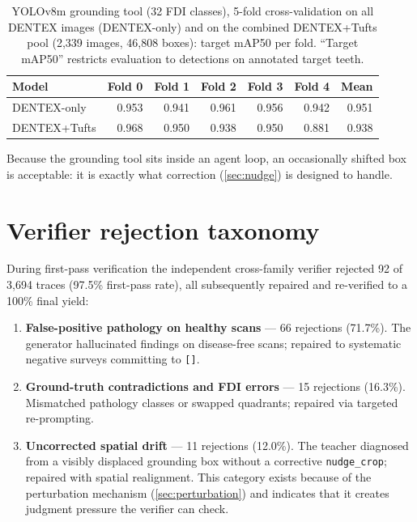 \begin{table}[htbp]
  \centering
  \small
  \caption{YOLOv8m grounding tool (32 FDI classes), 5-fold cross-validation on all DENTEX images
  (DENTEX-only) and on the combined DENTEX+Tufts pool (2{,}339 images, 46{,}808 boxes): target mAP50 per fold.
  ``Target mAP50'' restricts evaluation to detections on annotated target teeth.}
  \label{tab:grounding}
  \begin{tabular}{lrrrrrr}
    \toprule
    Model & Fold 0 & Fold 1 & Fold 2 & Fold 3 & Fold 4 & Mean \\
    \midrule
    DENTEX-only & 0.953 & 0.941 & 0.961 & 0.956 & 0.942 & 0.951 \\
    DENTEX+Tufts & 0.968 & 0.950 & 0.938 & 0.950 & 0.881 & 0.938 \\
    \bottomrule
  \end{tabular}
\end{table}

Because the grounding tool sits inside an agent loop, an occasionally shifted box is acceptable: it
is exactly what correction (\cref{sec:nudge}) is designed to handle.

\section{Verifier rejection taxonomy}
\label{app:verifier}

During first-pass verification the independent cross-family verifier rejected 92 of 3{,}694
traces (97.5\% first-pass rate), all subsequently repaired and re-verified to a 100\%
final yield:

\begin{enumerate}[leftmargin=*,itemsep=1pt,topsep=2pt]
  \item \textbf{False-positive pathology on healthy scans} --- 66 rejections (71.7\%). The
  generator hallucinated findings on disease-free scans; repaired to systematic negative surveys
  committing to \texttt{[]}.
  \item \textbf{Ground-truth contradictions and FDI errors} --- 15 rejections (16.3\%). Mismatched
  pathology classes or swapped quadrants; repaired via targeted re-prompting.
  \item \textbf{Uncorrected spatial drift} --- 11 rejections (12.0\%). The teacher diagnosed from
  a visibly displaced grounding box without a corrective \texttt{nudge\_crop}; repaired with
  spatial realignment. This category exists because of the perturbation mechanism
  (\cref{sec:perturbation}) and indicates that it creates judgment pressure the verifier can
  check.
\end{enumerate}

